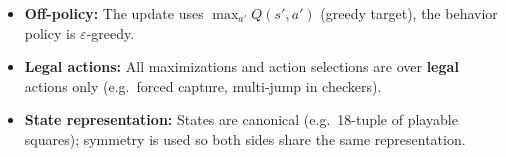 \documentclass[11pt,a4paper]{article}
\begin{document}
\begin{itemize}[noitemsep]
  \item \textbf{Off-policy:} The update uses $\max_{a'} Q(s', a')$ (greedy target), the behavior policy is $\varepsilon$-greedy.
  \item \textbf{Legal actions:} All maximizations and action selections are over \textbf{legal} actions only (e.g.\ forced capture, multi-jump in checkers).
  \item \textbf{State representation:} States are canonical (e.g.\ 18-tuple of playable squares); symmetry is used so both sides share the same representation.
\end{itemize}
\end{document}
